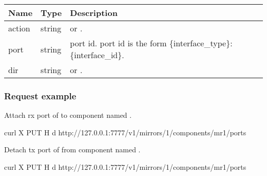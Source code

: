 \documentclass[a4paper,11pt,openany,oneside,english]{sphinxmanual}
\begin{document}
\begin{savenotes}\sphinxattablestart
\centering
{}
\sphinxthecaptionisattop
{}\label{\detokenize{api_ref/spp_mirror:id22}}\label{\detokenize{api_ref/spp_mirror:table-spp-ctl-spp-mirror-comp-port-body}}
\sphinxaftertopcaption
\begin{tabulary}{\linewidth}[t]{|T|T|T|}
\hline
\sphinxstyletheadfamily 
Name
&\sphinxstyletheadfamily 
Type
&\sphinxstyletheadfamily 
Description
\\
\hline
action
&
string
&
 or .
\\
\hline
port
&
string
&
port id. port id is the form \{interface\_type\}:\{interface\_id\}.
\\
\hline
dir
&
string
&
 or .
\\
\hline
\end{tabulary}
\par
\sphinxattableend\end{savenotes}


\subsubsection{Request example}
\label{\detokenize{api_ref/spp_mirror:id11}}
Attach rx port of  to component named .

\begin{sphinxVerbatim}[commandchars=\\\{\},formatcom=\footnotesize]
 curl \PYGZhy{}X PUT \PYGZhy{}H  
  \PYGZhy{}d  
  http://127.0.0.1:7777/v1/mirrors/1/components/mr1/ports
\end{sphinxVerbatim}

Detach tx port of  from component named .

\begin{sphinxVerbatim}[commandchars=\\\{\},formatcom=\footnotesize]
 curl \PYGZhy{}X PUT \PYGZhy{}H  
  \PYGZhy{}d  
  http://127.0.0.1:7777/v1/mirrors/1/components/mr1/ports
\end{sphinxVerbatim}
\end{document}
